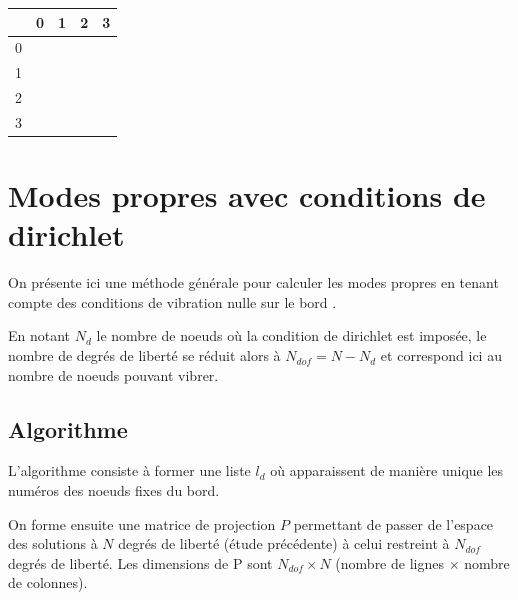 \documentclass[a4paper, 12pt]{article}
\newcommand{\matlabscript}[2]
  {\begin{itemize}\item[]\end{itemize}}
\begin{document}
\begin{enumerate}
\begin{center}
   \begin{tabular}{| c | c | c | c | c |}
     \hline
     & 0 & 1 & 2 & 3 \\ \hline
     0 &  &   &   &   \\ \hline
     1 &  &   &   &   \\ \hline
     2 &  &   &   &   \\ \hline
     3 &  &   &   &   \\ \hline 
     \hline
   \end{tabular}
 \end{center}
 
\end{enumerate} 

\section{Modes propres avec conditions de dirichlet}

On présente ici une méthode générale pour calculer les modes propres en 
tenant compte des conditions de vibration nulle sur le bord .

En notant $N_d$ le nombre de noeuds où  la condition de dirichlet est imposée, 
le nombre de degrés de liberté se réduit alors à $N_{dof}=N-N_d$ et correspond 
ici au nombre de noeuds pouvant vibrer.


\subsection{Algorithme}

L'algorithme consiste à former une liste $l_{d}$ où apparaissent de 
manière unique les numéros des noeuds fixes du bord. 

On forme  ensuite une matrice de projection $P$ permettant de passer de l'espace des solutions à $N$ degrés de liberté (étude précédente) à celui restreint à $N_{dof}$ degrés de liberté.
Les dimensions de P sont $N_{dof} \times N$ (nombre de lignes $\times$ nombre de colonnes).
\end{document}

